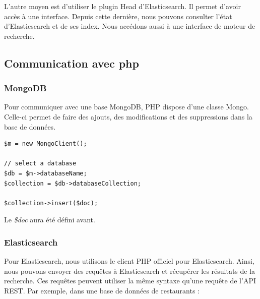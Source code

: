 L’autre moyen est d’utiliser le plugin Head d’Elasticsearch. Il permet d’avoir accès à une interface. Depuis cette dernière, nous pouvons consulter l’état d’Elasticsearch et de ses index. Nous accédons aussi à une interface de moteur de recherche.

\subsection{Communication avec php}
\subsubsection{MongoDB}

Pour communiquer avec une base MongoDB, PHP dispose d’une classe Mongo. Celle-ci permet de faire des ajouts, des modifications et des suppressions dans la base de données. 

\begin{verbatim}
$m = new MongoClient();

// select a database
$db = $m->databaseName;   
$collection = $db->databaseCollection;

$collection->insert($doc);
\end{verbatim}

Le \textit{\$doc} aura été défini avant.

\subsubsection{Elasticsearch}

Pour Elasticsearch, nous utilisons le client PHP officiel pour Elasticsearch. Ainsi, nous pouvons envoyer des requêtes à Elasticsearch et récupérer les résultats de la recherche. Ces requêtes peuvent utiliser la même syntaxe qu’une requête de l’API REST. Par exemple, dans une base de données de restaurants :


